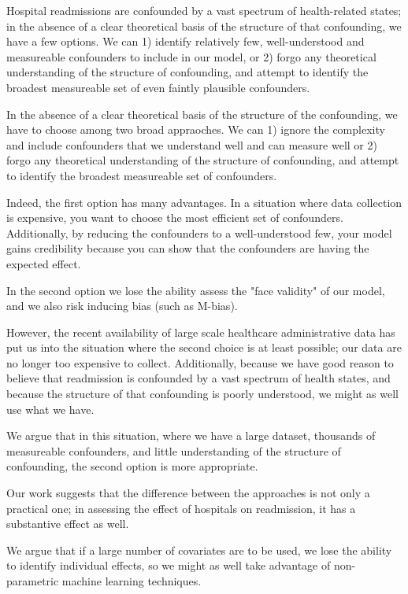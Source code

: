 \documentclass[]{article}\usepackage[]{graphicx}\usepackage[]{color}
\begin{document}
Hospital readmissions are confounded by a vast spectrum of health-related states; in the absence of a clear theoretical basis of the structure of that confounding, we have a few options. We can 1) identify relatively few, well-understood and measureable confounders to include in our model, or 2) forgo any theoretical understanding of the structure of confounding, and attempt to identify the broadest measureable set of even faintly plausible confounders.



In the absence of a clear theoretical basis of the structure of the confounding, we have to choose among two broad appraoches. We can 1) ignore the complexity and include confounders that we understand well and can measure well or 2) forgo any theoretical understanding of the structure of confounding, and attempt to identify the broadest measureable set of confounders.

Indeed, the first option has many advantages. In a situation where data collection is expensive, you want to choose the most efficient set of confounders. Additionally, by reducing the confounders to a well-understood few, your model gains credibility because you can show that the confounders are having the expected effect.

In the second option we lose the ability assess the "face validity" of our model, and we also risk inducing bias (such as M-bias).

However, the recent availability of large scale healthcare administrative data has put us into the situation where the second choice is at least possible; our data are no longer too expensive to collect. Additionally, because we have good reason to believe that readmission is confounded by a vast spectrum of health states, and because the structure of that confounding is poorly understood, we might as well use what we have.

We argue that in this situation, where we have a large dataset, thousands of measureable confounders, and little understanding of the structure of confounding, the second option is more appropriate.


Our work suggests that the difference between the approaches is not only a practical one; in assessing the effect of hospitals on readmission, it has a substantive effect as well.

We argue that if a large number of covariates are to be used, we lose the ability to identify individual effects, so we might as well take advantage of non-parametric machine learning techniques. 
\end{document}
